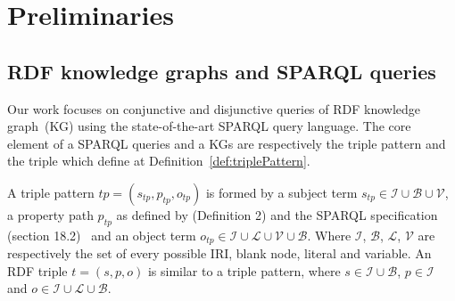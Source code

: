 \section{Preliminaries}






\subsection{RDF knowledge graphs and SPARQL queries}
Our work focuses on conjunctive and disjunctive queries of RDF knowledge graph~(KG) using the state-of-the-art SPARQL query language.
The core element of a SPARQL queries and a KGs are respectively the triple pattern and the triple which define at Definition~\ref{def:triplePattern}.

\begin{definition}\label{def:triplePattern}
    A triple pattern $tp = (s_{tp}, p_{tp} , o_{tp})$ is formed by a subject term $s_{tp} \in \mathcal{I} \cup \mathcal{B} \cup \mathcal{V}$, 
    a property path  $p_{tp}$ as defined by  \citeauthor{Kostylev2015} (Definition 2) and the SPARQL specification (section 18.2)~ 
    and an object term  $o_{tp} \in \mathcal{I} \cup \mathcal{L} \cup \mathcal{V} \cup \mathcal{B}$.
    Where $\mathcal{I}$, $\mathcal{B}$, $\mathcal{L}$, $\mathcal{V}$ are respectively the set of every possible IRI, blank node, literal and variable.
    An RDF triple $t = (s,p,o)$ is similar to a triple pattern, 
    where $s \in\mathcal{I} \cup \mathcal{B}$,
    $p \in \mathcal{I}$ and $o \in \mathcal{I} \cup \mathcal{L} \cup \mathcal{B}$.
\end{definition}

